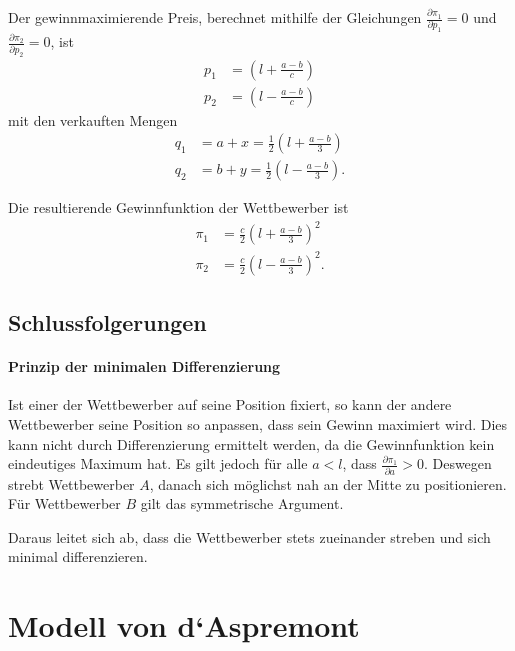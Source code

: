 Der gewinnmaximierende Preis, berechnet mithilfe der Gleichungen $\frac{\partial \pi_1}{\partial p_1}=0$ und $\frac{\partial \pi_2}{\partial p_2}=0$, ist
\begin{equation}
\begin{split}
p_1 &= \left(l+\frac{a-b}{c}\right) \\
p_2 &= \left(l-\frac{a-b}{c}\right)
\end{split}
\end{equation}
mit den verkauften Mengen
\begin{equation}
\begin{split}
q_1 &= a + x = \tfrac{1}{2} \left(l + \frac{a-b}{3}\right) \\
q_2 &= b + y = \tfrac{1}{2} \left(l - \frac{a-b}{3}\right)
.\end{split}
\end{equation}

Die resultierende Gewinnfunktion der Wettbewerber ist
\begin{equation}\label{eqn:Gewinnfunktion}
\begin{split}
\pi_1 &= \frac{c}{2} \left(l+\frac{a-b}{3}\right)^2 \\
\pi_2 &= \frac{c}{2} \left(l-\frac{a-b}{3}\right)^2
.\end{split}
\end{equation}

\subsection{Schlussfolgerungen}
\paragraph{Prinzip der minimalen Differenzierung}
Ist einer der Wettbewerber auf seine Position fixiert, so kann der andere Wettbewerber seine Position so anpassen, dass sein Gewinn maximiert wird. Dies kann nicht durch Differenzierung ermittelt werden, da die Gewinnfunktion kein eindeutiges Maximum hat. Es gilt jedoch für alle $a<l$, dass $\frac{\partial \pi_1}{\partial a} > 0$. Deswegen strebt Wettbewerber $A$, danach sich möglichst nah an der Mitte zu positionieren. Für Wettbewerber $B$ gilt das symmetrische Argument. \citep[S.\,51-2]{hotelling1929}

Daraus leitet sich ab, dass die Wettbewerber stets zueinander streben und sich minimal differenzieren.

\section{Modell von d‘Aspremont}\label{Sec-Aspremont}

